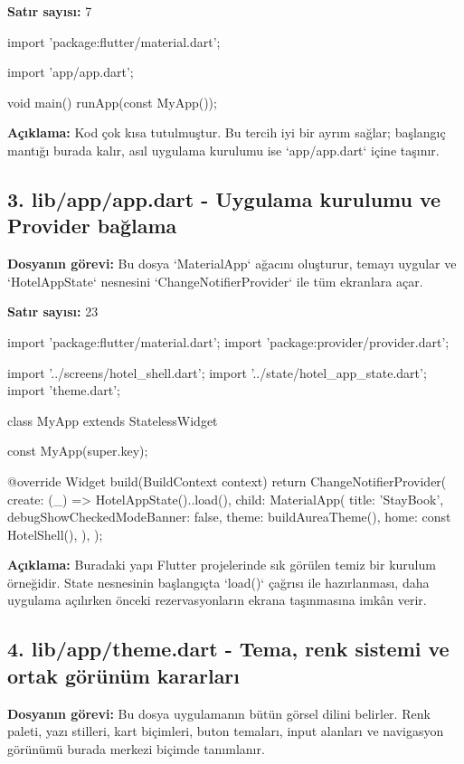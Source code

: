 \documentclass[11pt,a4paper]{article}
\begin{document}
\textbf{Satır sayısı:} 7

\begin{codeblock}
import 'package:flutter/material.dart';

import 'app/app.dart';

void main() {
  runApp(const MyApp());
}
\end{codeblock}

\textbf{Açıklama:} Kod çok kısa tutulmuştur. Bu tercih iyi bir ayrım sağlar; başlangıç mantığı burada kalır, asıl uygulama kurulumu ise `app/app.dart` içine taşınır.

\clearpage
\subsection{3. lib/app/app.dart - Uygulama kurulumu ve Provider bağlama}
\textbf{Dosyanın görevi:} Bu dosya `MaterialApp` ağacını oluşturur, temayı uygular ve `HotelAppState` nesnesini `ChangeNotifierProvider` ile tüm ekranlara açar.

\textbf{Satır sayısı:} 23

\begin{codeblock}
import 'package:flutter/material.dart';
import 'package:provider/provider.dart';

import '../screens/hotel_shell.dart';
import '../state/hotel_app_state.dart';
import 'theme.dart';

class MyApp extends StatelessWidget {
  const MyApp({super.key});

  @override
  Widget build(BuildContext context) {
    return ChangeNotifierProvider(
      create: (_) => HotelAppState()..load(),
      child: MaterialApp(
        title: 'StayBook',
        debugShowCheckedModeBanner: false,
        theme: buildAureaTheme(),
        home: const HotelShell(),
      ),
    );
  }
}
\end{codeblock}

\textbf{Açıklama:} Buradaki yapı Flutter projelerinde sık görülen temiz bir kurulum örneğidir. State nesnesinin başlangıçta `load()` çağrısı ile hazırlanması, daha uygulama açılırken önceki rezervasyonların ekrana taşınmasına imkân verir.

\clearpage
\subsection{4. lib/app/theme.dart - Tema, renk sistemi ve ortak görünüm kararları}
\textbf{Dosyanın görevi:} Bu dosya uygulamanın bütün görsel dilini belirler. Renk paleti, yazı stilleri, kart biçimleri, buton temaları, input alanları ve navigasyon görünümü burada merkezi biçimde tanımlanır.
\end{document}
